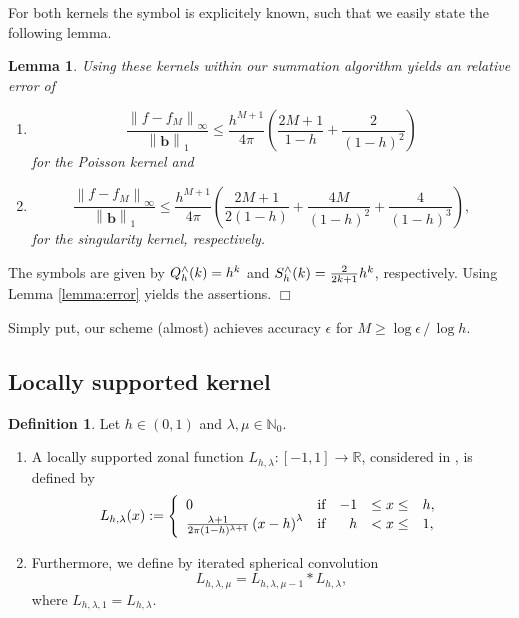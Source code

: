 \documentclass[11pt,a4paper,twoside,bibtotoc]{scrartcl}
\theoremstyle{plain}
\newtheorem{lemma}[theorem]{Lemma}
\theoremstyle{definition}
\newtheorem{definition}[theorem]{Definition}
\theoremstyle{remark}
\newenvironment{proof}{{\bf Proof.}}{$\Box$}
\newcommand{\NZ}{\ensuremath{\mathbb{N}_{0}}}
\newcommand{\R}{\ensuremath{\mathbb{R}}}
\newcommand{\interv}[4]{\ensuremath{\left#1\left.#2,#3\right#4\right.}}
\newcommand{\fun}[2]{\ensuremath{#1{\hspace{-0.4ex}}\left(#2\right)}}
\newcommand{\paren}[1]{\ensuremath{\left(#1\right)}}
\newcommand{\mb}[1]{\mathbf{#1}}
\newcommand{\V}[1]{\mb{#1}}
\numberwithin{equation}{section}
\numberwithin{table}{section}
\numberwithin{figure}{section}
\begin{document}
For both kernels the symbol is explicitely known, such that we easily state
the following lemma.
\begin{lemma}
 Using these kernels within our summation algorithm yields an relative error
 of
 \begin{enumerate}
   \item
     \begin{equation}
       \label{error:poisson}
       \frac{\left\|f - f_{M}\right\|_{\infty}}{\left\|\V{b}\right\|_1} \le
       \frac{h^{M+1}}{4\pi} \left(\frac{2M+1}{1-h}+\frac{2}{\left(1-h\right)^2}\right)
     \end{equation}
     for the Poisson kernel and
     \item 
       \begin{equation}
         \label{error:singular}
         \frac{\left\|f - f_{M}\right\|_{\infty}}{\left\|\V{b}\right\|_1} \le
         \frac{h^{M+1}}{4\pi} \left(\frac{2M+1}{2\left(1-h\right)}+
           \frac{4M}{\left(1-h\right)^2}+ \frac{4}{\left(1-h\right)^3}\right),
       \end{equation}
       for the singularity kernel, respectively.
 \end{enumerate}
\end{lemma}
\begin{proof}
The symbols are given by $\fun{Q_{h}^{\wedge}}{k}=h^k$ and
$\fun{S_{h}^{\wedge}}{k}=\frac{2}{2k+1}h^k$, respectively.
Using Lemma \ref{lemma:error} yields the assertions.
\end{proof}
  
Simply put, our scheme (almost) achieves accuracy $\epsilon$ for $M \ge \log\epsilon \,
/ \, \log h$.

\subsection{Locally supported kernel}
\begin{definition}
  Let $h \in \interv{(}{0}{1}{)}$ and $\lambda,\mu \in \NZ$.
  \begin{enumerate}
  \item A locally supported zonal function
    $L_{h,\lambda}:\interv{[}{-1}{1}{]} \rightarrow \R$, considered in
    \cite{Sc97}, is defined by
    \[
    \fun{L_{h,\lambda}}{x} := 
    \left\{\begin{array}{l@{\quad \text{if} \quad}rcl} 
        0 & -1 &\le x \le& h, \\
        \frac{\lambda+1}{2\pi(1-h)^{\lambda+1}}\paren{x-h}^{\lambda} &  h & <  x \le& 1,
      \end{array}\right.
    \]
  \item Furthermore, we define by iterated spherical convolution
    \[
    L_{h,\lambda,\mu} = L_{h,\lambda,\mu-1} * L_{h,\lambda},
    \]
    where $L_{h,\lambda,1}=L_{h,\lambda}$.
  \end{enumerate}
\end{definition}
\end{document}
